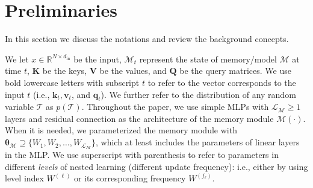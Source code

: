 \documentclass{article}
\newcommand{\vv}{\mathbf{v}}
\newcommand{\R}[0]{\mathbb{R}}
\newcommand{\M}[0]{\mathcal{M}}
\newcommand{\head}[1]{\vspace{1.7mm}\noindent{{\textcolor{c4}{\bf #1.}}}}
\newcommand{\vk}{\boldsymbol{k}}
\newcommand{\vq}{\boldsymbol{q}}
\renewcommand{\vv}{\boldsymbol{v}}
\begin{document}
\section{Preliminaries}\label{sec:prelim}
In this section we discuss the notations and  review the background concepts. 

\head{Notations}
We let $x \in \R^{N \times d_{\text{in}}}$ be the input, $\M_t$ represent the state of memory/model $\M$ at time $t$, $\mathbf{K}$ be the keys, $\mathbf{V}$ be the values, and $\mathbf{Q}$ be the query matrices. We use bold lowercase letters with subscript $t$ to refer to the vector corresponds to the input $t$ (i.e., $\vk_t, \vv_t$, and $\vq_t$). We further refer to the distribution of any random variable $\mathcal{T}$ as $p(\mathcal{T})$. Throughout the paper, we use simple MLPs with $\mathcal{L}_{\M} \geq 1$ layers and residual connection as the architecture of the memory module $\M(\cdot)$. When it is needed, we parameterized the memory module with $\boldsymbol{\theta}_{\M} \supseteq \{W_1, W_2, \dots, W_{\mathcal{L}_{\M}} \}$, which at least includes the parameters of linear layers in the MLP. We use superscript with parenthesis to refer to parameters in different \emph{levels} of nested learning (different update frequency): i.e., either by using level index $W^{(\ell)}$ or its corresponding frequency $W^{(f_\ell)}$. 
\end{document}

